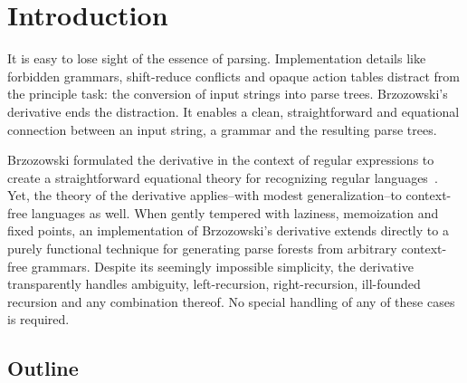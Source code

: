 \newcommand{\downto}{\downarrow}

\newcommand{\full}[1]{\lfloor #1 \rfloor}

\newcommand{\ttempty}{$\emptyset$}
\newcommand{\ttdelta}{$\updelta$}
\newcommand{\ttepsilon}{$\upepsilon$}

\newcommand{\ttepstar}{$\upepsilon$\mbox{\tt *}}
\newcommand{\ttepsred}{$\upepsilon\downarrow$}


\newcommand{\ttcup}{{\footnotesize\ensuremath{{\cup}}}}
\newcommand{\ttcirc}{$\mathtt{\circ}$}
\newcommand{\ttstar}{$\mathtt{\star}$}
\newcommand{\ttred}{{{\tt →}}}

\newcommand{\ttlb}{\mbox{\tt\{}}
\newcommand{\ttrb}{\mbox{\tt\}}}



\section{Introduction}


It is easy to lose sight of the essence of parsing.
%
Implementation details like forbidden grammars, shift-reduce conflicts and
opaque action tables distract from the principle task: the conversion of
input strings into parse trees.
%
Brzozowski's derivative ends the distraction.
%
It enables a clean,
straightforward and equational connection between an input string, a grammar
and the resulting parse trees.



Brzozowski formulated the derivative in the context of regular expressions to
create a straightforward equational theory for recognizing regular
languages~\cite{mattmight:Brzozowski:1964:Derivative}.
%
Yet, the theory of the derivative applies--with modest generalization--to
context-free languages as well.
%
When gently tempered with laziness, memoization and fixed points, an
implementation of Brzozowski's derivative extends directly to a purely
functional technique for generating parse forests from arbitrary context-free
grammars.
%
Despite its seemingly impossible simplicity, the derivative transparently handles
ambiguity, left-recursion, right-recursion, ill-founded recursion and any
combination thereof.
%
No special handling of any of these cases is required.


\subsection{Outline}

